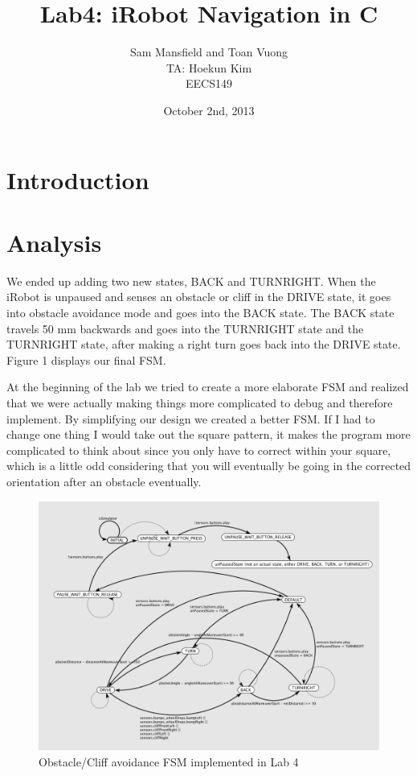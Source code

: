 \documentclass[10pt,titlepage]{article}
\begin{document}
  \title{Lab4: iRobot Navigation in C}
  \author{Sam Mansfield and Toan Vuong\\
          TA: Hoekun Kim\\ 
          EECS149}
  \date{October 2nd, 2013}
  \maketitle

  \section{Introduction}

  \section{Analysis}
     
      We ended up adding two new states, BACK and TURNRIGHT. When the iRobot is unpaused and senses an obstacle or cliff in the DRIVE state, it goes into obstacle avoidance mode and goes into the BACK state. The BACK state travels 50 mm backwards and goes into the TURNRIGHT state and the TURNRIGHT state, after making a right turn goes back into the DRIVE state. Figure 1 displays our final FSM.

      At the beginning of the lab we tried to create a more elaborate FSM and realized that we were actually making things more complicated to debug and therefore implement. By simplifying our design we created a better FSM. If I had to change one thing I would take out the square pattern, it makes the program more complicated to think about since you only have to correct within your square, which is a little odd considering that you will eventually be going in the corrected orientation after an obstacle eventually.
    
    \begin{figure}[h!]
      \centering
        \includegraphics[width=1\textwidth]{../lab4_data/FSMLab4}
      \caption{Obstacle/Cliff avoidance FSM implemented in Lab 4}
    \end{figure}
\end{document}
